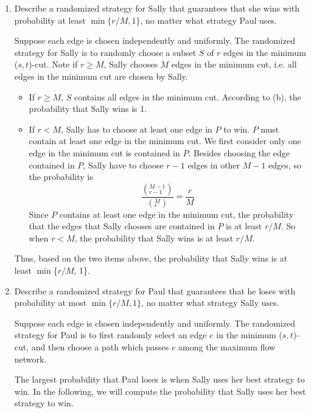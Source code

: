 \documentclass[letterpaper,11pt]{article}
\begin{document}
\begin{enumerate}
\begin{enumerate}
  \item 
    Describe a randomized strategy for Sally that guarantees that she wins with
    probability at least $\min\{r/M,1\}$, no matter what strategy Paul uses.
    \begin{solution}
      Suppose each edge is chosen independently and uniformly. The randomized
strategy for Sally is to randomly choose a subset $S$ of $r$ edges in the
minimum ($s, t$)-cut. Note if $r \ge M$, Sally chooses $M$ edges in the minimum
cut, i.e. all edges in the minimum cut are chosen by Sally.
\begin{itemize}
\item If $r \ge M$, $S$ contains all edges in the minimum cut. According to
  (b), the probability that Sally wins is 1.
\item If $r < M$, Sally has to choose at least one edge in $P$ to win. $P$ must
  contain at least one edge in the minimum cut. We first consider only one edge
  in the minimum cut is contained in $P$. Besides choosing the edge contained
  in $P$, Sally have to choose $r-1$ edges in other $M-1$ edges, so  the
  probability is
\[
\frac{\left(^{M-1}_{r-1}\right)}{\left(^M_r\right)} = \frac{r}{M}
\] 
Since $P$ contains at least one edge in the minimum cut, the probability that
the edges that Sally chooses are contained in $P$ is at least $r/M$. So when $r
< M$, the probability that Sally wins is at least $r/M$.
\end{itemize}
Thus, based on the two items above, the probability that Sally wins is at least
$\min$\{$r/M$, 1\}.

    \end{solution}
  \item 
    Describe a randomized strategy for Paul that guarantees that he loses with
    probability at most $\min\{r/M,1\}$, no matter what strategy Sally uses.
    \begin{solution}
Suppose each edge is chosen independently and uniformly. The randomized
strategy for Paul is to first randomly select an edge $e$ in the 
minimum ($s, t$)-cut, and then choose a path which passes $e$ among the maximum
flow network. 

The largest probability that Paul loses is when Sally uses her best strategy to
win. In the following, we will compute the probability that Sally uses her best
strategy to win. 


\end{solution}
\end{enumerate}
\end{enumerate}
\end{document}
